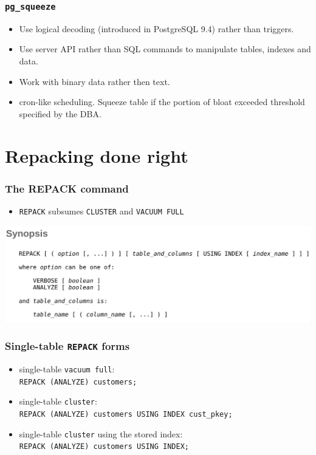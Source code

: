 \begin{frame}
  \frametitle{\texttt{pg\_squeeze}}
  \begin{itemize}
    \item Use logical decoding (introduced in PostgreSQL 9.4) rather than
      triggers.
    \item Use server API rather than SQL commands to manipulate tables,
      indexes and data.
    \item Work with binary data rather then text.
    \item cron-like scheduling. Squeeze table if the portion of bloat exceeded
      threshold specified by the DBA.
  \end{itemize}
\end{frame}



\section{Repacking done right}
\begin{frame}
  \frametitle{The REPACK command}
  \begin{itemize}
    \item \texttt{REPACK} subsumes \texttt{CLUSTER} and \texttt{VACUUM FULL}
  \end{itemize}
  \includegraphics[width=\textwidth]{repack.png}
\end{frame}

\begin{frame}
  \frametitle{Single-table \texttt{REPACK} forms}
  \begin{itemize}
    \item single-table \texttt{vacuum full}: \\
      \texttt{REPACK (ANALYZE) customers;}
    \item single-table \texttt{cluster}: \\
      \texttt{REPACK (ANALYZE) customers USING INDEX cust\_pkey;}
    \item single-table \texttt{cluster} using the stored index: \\
      \texttt{REPACK (ANALYZE) customers USING INDEX;}
  \end{itemize}
\end{frame}

